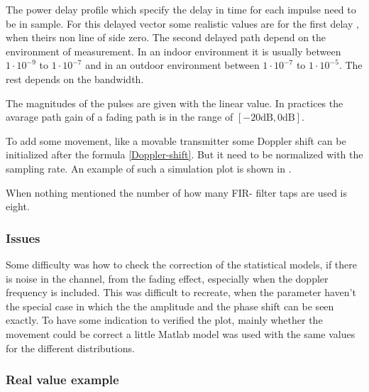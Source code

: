 The power delay profile which specify the delay in time for each impulse need to be in sample. For this delayed vector some realistic values are for the first delay \cite{Mathworks}, when theirs non line of side zero. The second delayed path depend on the environment of measurement. In an indoor environment it is usually between \(1\cdot10^{-9}\) to \(1\cdot10^{-7}\) and in an outdoor environment between \(1\cdot10^{-7}\) to \(1\cdot10^{-5}\). The rest depends on  the bandwidth. 

The magnitudes of the pulses are given with the linear value. In practices the avarage path gain of a fading path is in the range of \([ -20 \text{dB} , 0\text{dB}]\).

To add some movement, like a movable transmitter some Doppler shift can be initialized after the formula \eqref{Doppler-shift}. But it need to be normalized with the sampling rate. 
An example of such a simulation plot is shown in .

When nothing mentioned the number of how many FIR- filter taps are used is eight.

\subsubsection{Issues}

Some difficulty was how to check the correction of the statistical models, if there is noise in the channel, from the fading effect, especially when the doppler frequency is included. This was difficult to recreate, when the parameter haven't the special case in which the the amplitude and the phase shift can be seen exactly. 
To have some indication to verified the plot, mainly whether the movement could be correct a little Matlab model was used with the same values for the different distributions.

\subsubsection{Real value example}

